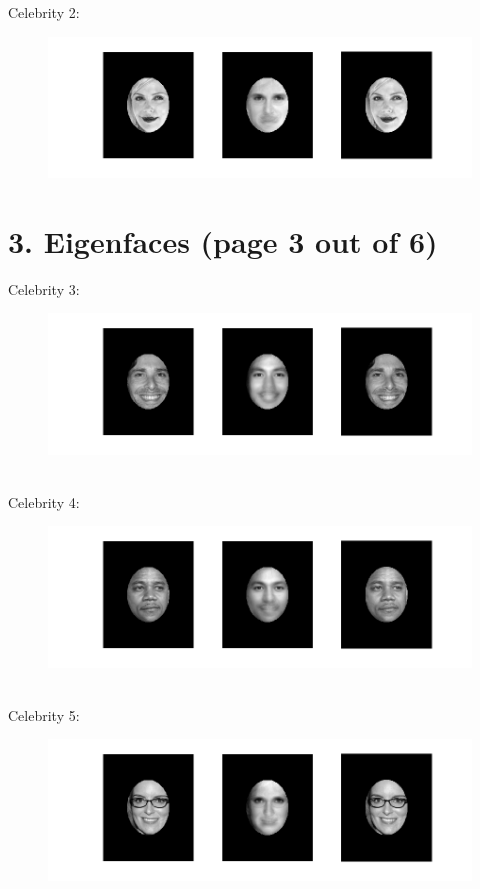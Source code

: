 \documentclass[11pt]{article}
\begin{document}
Celebrity 2:
\begin{figure}[ht!]
\centering
\includegraphics[width=180mm]{images/celeb2.png}
\label{overflow}
\end{figure}
\newpage

\section*{3. Eigenfaces (page 3 out of 6)}
Celebrity 3:
\begin{figure}[ht!]
\centering
\includegraphics[width=180mm]{images/celeb3.png}
\label{overflow}
\end{figure} \\
Celebrity 4:
\begin{figure}[ht!]
\centering
\includegraphics[width=180mm]{images/celeb4.png}
\label{overflow}
\end{figure} \\
Celebrity 5:
\begin{figure}[ht!]
\centering
\includegraphics[width=180mm]{images/celeb5.png}
\label{overflow}
\end{figure}
\newpage
\end{document}

